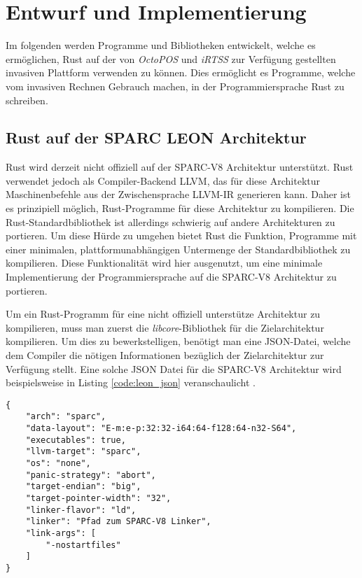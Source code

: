 \chapter{Entwurf und Implementierung}\label{sec:impl}

Im folgenden werden Programme und Bibliotheken entwickelt, welche es ermöglichen, Rust auf der von
\textit{OctoPOS} und \textit{iRTSS} zur Verfügung gestellten invasiven Plattform verwenden zu können.
Dies ermöglicht es Programme, welche vom invasiven Rechnen Gebrauch machen, in der
Programmiersprache Rust zu schreiben.

\section{Rust auf der SPARC LEON Architektur}\label{sec:rust_on_sparc}

Rust wird derzeit nicht offiziell auf der SPARC-V8 Architektur unterstützt. Rust verwendet jedoch als Compiler-Backend
LLVM, das für diese Architektur Maschinenbefehle aus der Zwischensprache LLVM-IR generieren kann.
Daher ist es prinzipiell möglich, Rust-Programme für diese Architektur zu kompilieren.
Die Rust-Standardbibliothek ist allerdings schwierig auf andere Architekturen zu portieren.
Um diese Hürde zu umgehen bietet Rust die Funktion,
Programme mit einer minimalen, plattformunabhängigen Untermenge der Standardbibliothek zu kompilieren.
Diese Funktionalität wird hier ausgenutzt,
um eine minimale Implementierung der Programmiersprache auf die SPARC-V8 Architektur zu portieren.

Um ein Rust-Programm für eine nicht offiziell unterstütze Architektur zu kompilieren,
muss man zuerst die \textit{libcore}-Bibliothek
für die Zielarchitektur kompilieren. Um dies zu bewerkstelligen, benötigt man eine JSON-Datei, welche
dem Compiler die nötigen Informationen bezüglich der Zielarchitektur zur Verfügung stellt.
Eine solche JSON Datei für die
SPARC-V8 Architektur wird beispielsweise in Listing \ref{code:leon_json} veranschaulicht
\cite{initialSparcSupportGithub}.

\begin{lstlisting}[float,caption={
Eine beispielhafte JSON-Spezifikationsdatei für die SPARC-V8 Architektur
\cite{initialSparcSupportGithub.}
},label=code:leon_json]
{
    "arch": "sparc",
    "data-layout": "E-m:e-p:32:32-i64:64-f128:64-n32-S64",
    "executables": true,
    "llvm-target": "sparc",
    "os": "none",
    "panic-strategy": "abort",
    "target-endian": "big",
    "target-pointer-width": "32",
    "linker-flavor": "ld",
    "linker": "Pfad zum SPARC-V8 Linker",
    "link-args": [
        "-nostartfiles"
    ]
}
\end{lstlisting}

